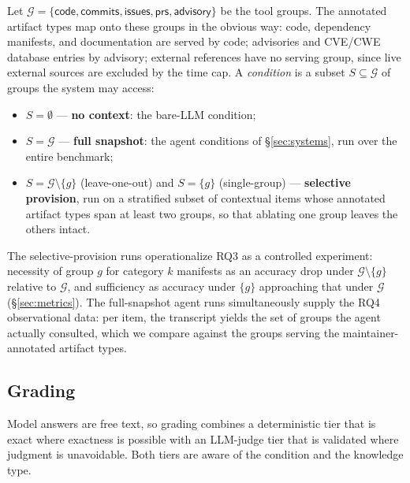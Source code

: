 Let $\mathcal{G} = \{\textsf{code}, \textsf{commits}, \textsf{issues},
\textsf{prs}, \textsf{advisory}\}$ be the tool groups. The annotated artifact
types map onto these groups in the obvious way: code, dependency manifests,
and documentation are served by \textsf{code}; advisories and CVE/CWE database
entries by \textsf{advisory}; external references have no serving group, since
live external sources are excluded by the time cap. A \emph{condition} is a
subset $S \subseteq \mathcal{G}$ of groups the system may access:

\begin{itemize}
  \item $S = \emptyset$ --- \textbf{no context}: the bare-LLM condition;
  \item $S = \mathcal{G}$ --- \textbf{full snapshot}: the agent conditions of
        \S\ref{sec:systems}, run over the entire benchmark;
  \item $S = \mathcal{G} \setminus \{g\}$ (leave-one-out) and $S = \{g\}$
        (single-group) --- \textbf{selective provision}, run on a stratified
        subset of contextual items whose annotated artifact types span at least
        two groups, so that ablating one group leaves the others intact.
\end{itemize}

The selective-provision runs operationalize RQ3 as a controlled experiment:
necessity of group $g$ for category $k$ manifests as an accuracy drop under
$\mathcal{G} \setminus \{g\}$ relative to $\mathcal{G}$, and sufficiency as
accuracy under $\{g\}$ approaching that under $\mathcal{G}$
(\S\ref{sec:metrics}). The full-snapshot agent runs simultaneously supply the
RQ4 observational data: per item, the transcript yields the set of groups the
agent actually consulted, which we compare against the groups serving the
maintainer-annotated artifact types.

\subsection{Grading}
\label{sec:grading}

Model answers are free text, so grading combines a deterministic tier that is
exact where exactness is possible with an LLM-judge tier that is validated
where judgment is unavoidable. Both tiers are aware of the condition and the
knowledge type.

